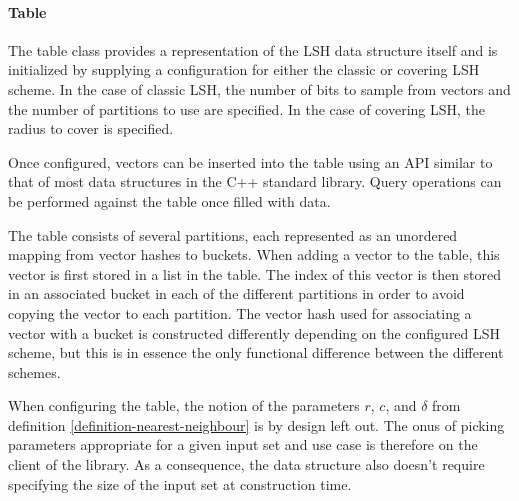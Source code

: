 \paragraph{Table} The table class provides a representation of the LSH data structure itself and is initialized by supplying a configuration for either the classic or covering LSH scheme. In the case of classic LSH, the number of bits to sample from vectors and the number of partitions to use are specified. In the case of covering LSH, the radius to cover is specified.

Once configured, vectors can be inserted into the table using an API similar to that of most data structures in the C++ standard library. Query operations can be performed against the table once filled with data.

The table consists of several partitions, each represented as an unordered mapping from vector hashes to buckets. When adding a vector to the table, this vector is first stored in a list in the table. The index of this vector is then stored in an associated bucket in each of the different partitions in order to avoid copying the vector to each partition. The vector hash used for associating a vector with a bucket is constructed differently depending on the configured LSH scheme, but this is in essence the only functional difference between the different schemes.

When configuring the table, the notion of the parameters $r$, $c$, and $\delta$ from definition \ref{definition-nearest-neighbour} is by design left out. The onus of picking parameters appropriate for a given input set and use case is therefore on the client of the library. As a consequence, the data structure also doesn't require specifying the size of the input set at construction time.
